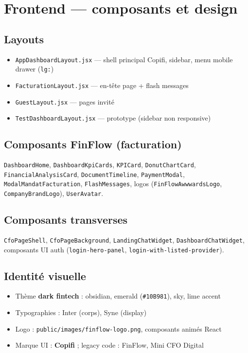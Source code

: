 \documentclass[11pt,a4paper]{report}
\newcommand{\filepath}[1]{\texttt{\small #1}}
\begin{document}
\chapter{Frontend — composants et design}

\section{Layouts}

\begin{itemize}[leftmargin=1.5em]
    \item \filepath{AppDashboardLayout.jsx} — shell principal Copifi, sidebar, menu mobile drawer (\texttt{lg:})
    \item \filepath{FacturationLayout.jsx} — en-tête page + flash messages
    \item \filepath{GuestLayout.jsx} — pages invité
    \item \filepath{TestDashboardLayout.jsx} — prototype (sidebar non responsive)
\end{itemize}

\section{Composants FinFlow (facturation)}

\texttt{DashboardHome}, \texttt{DashboardKpiCards}, \texttt{KPICard}, \texttt{DonutChartCard}, \texttt{FinancialAnalysisCard}, \texttt{DocumentTimeline}, \texttt{PaymentModal}, \texttt{ModalMandatFacturation}, \texttt{FlashMessages}, logos (\texttt{FinFlowAwwwardsLogo}, \texttt{CompanyBrandLogo}), \texttt{UserAvatar}.

\section{Composants transverses}

\texttt{CfoPageShell}, \texttt{CfoPageBackground}, \texttt{LandingChatWidget}, \texttt{DashboardChatWidget}, composants UI auth (\texttt{login-hero-panel}, \texttt{login-with-listed-provider}).

\section{Identité visuelle}

\begin{itemize}[leftmargin=1.5em]
    \item Thème \textbf{dark fintech} : obsidian, emerald (\texttt{\#10B981}), sky, lime accent
    \item Typographies : Inter (corps), Syne (display)
    \item Logo : \filepath{public/images/finflow-logo.png}, composants animés React
    \item Marque UI : \textbf{Copifi} ; legacy code : FinFlow, Mini CFO Digital
\end{itemize}
\end{document}
